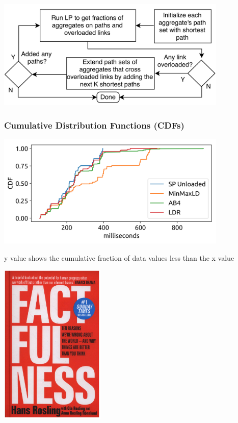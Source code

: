 \documentclass{beamer} %
\begin{document}
\begin{frame}
  \centering
  \includegraphics[width=110mm]{assets/ldr-flowchart}
\end{frame}

\begin{frame}
  \frametitle{Cumulative Distribution Functions (CDFs)}
  \centering
  \includegraphics[width=110mm]{assets/cdf}

  y value shows the cumulative fraction of data values less than the x value
\end{frame}

\begin{frame}
  \centering
  \includegraphics[width=50mm]{assets/factfulness}
\end{frame}


\end{document}

